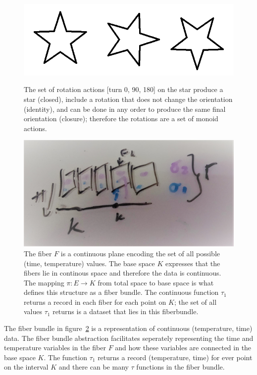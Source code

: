 


\begin{figure}[ht!]
    \includegraphics[width=\textwidth]{figures/math/rotation_actions.png}
    \label{fig:data_monoid_rotation}
    \caption{The set of rotation actions [turn 0, 90, 180] on the star produce a star (closed), include a rotation that does not change the orientation (identity), and can be done in any order to produce the same final orientation (closure); therefore the rotations are a set of monoid actions.
    }  
\end{figure}

\begin{figure}[ht!]
    \includegraphics[width=.5\linewidth]{figures/math/fiberbundle.png}
  
    \caption{ The fiber $F$ is a continuous plane encoding the set of all possible (time, temperature) values.  The base space $K$ expresses that the fibers lie in continous space and therefore the data is continuous. The mapping $\pi:E\rightarrow K$ from total space to base space is what defines this structure as a fiber bundle. The continuous function $\tau_1$ returns a record in each fiber for each point on $K$; the set of all values $\tau_1$ returns is a dataset that lies in this fiberbundle. }
    \label{fig:data_base_space} 
\end{figure}
The fiber bundle in figure~\ref{fig:data_base_space} is a representation of continuous (temperature, time) data. The fiber bundle abstraction facilitates seperately representing the time and temperature variables in the fiber $F$ and how these variables are connected in the base space $K$.  The function $\tau_1$ returns a record (temperature, time) for ever point on the interval $K$ and there can be many $\tau$ functions in the fiber bundle. 
